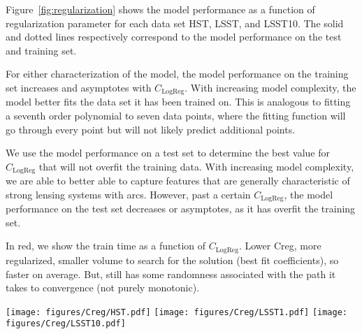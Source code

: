 \documentclass{emulateapj}
\begin{document}
Figure~\ref{fig:regularization} shows the model performance as a
function of regularization parameter for each data set HST, LSST, and
LSST10.  The solid and dotted lines respectively correspond to the
model performance on the test and training set.  

For either characterization of the model, the model performance on the
training set increases and asymptotes with $C_\text{LogReg}$.  With
increasing model complexity, the model better fits the data set it has
been trained on.  This is analogous to fitting a seventh order
polynomial to seven data points, where the fitting function will go
through every point but will not likely predict additional points.

We use the model performance on a test set to determine the best value
for $C_\text{LogReg}$ that will not overfit the training data.  With
increasing model complexity, we are able to better able to capture
features that are generally characteristic of strong lensing systems
with arcs.  However, past a certain $C_\text{LogReg}$, the model
performance on the test set decreases or asymptotes, as it has overfit
the training set.

In red, we show the train time as a function of $C_\text{LogReg}$.
Lower Creg, more regularized, smaller volume to search for the
solution (best fit coefficients), so faster on average.  But, still
has some randomness associated with the path it takes to convergence
(not purely monotonic).

\begin{figure*}[t]\label{fig:regularization}
\begin{center}
\texttt{[image: figures/Creg/HST.pdf]}
\texttt{[image: figures/Creg/LSST1.pdf]}
\texttt{[image: figures/Creg/LSST10.pdf]}
\caption{AUC of the model with varying LR regularization coefficient
  parameter, $C_{reg}$, used when training the model classifier.  We
  use a subset of the the 10,000 training images to search over the LR
  $C_{reg}$ parameter, training on 8,000 and testing on 1,000.  Each
  panel corresponds to a different mock observation.  From left to
  right: HST, LSST for one year, and LSST for 10 years.  The solid
  blue lines correspond to the AUC of the test set, and the dotted
  blue lines to the AUC of the training set.  To avoid overfitting, we
  choose the smallest parameter for which the AUC of the test set is
  maximal: 5000, 10, and 5000, respectively.  In thin red solid lines,
  we show the train time of the model, which roughly increases in a
  log-log scaling with logistic regression coefficient parameter.}
\end{center}
\end{figure*}
\end{document}
